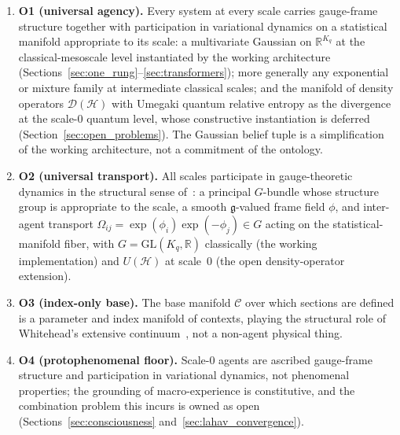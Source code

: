 \documentclass[11pt]{article}
\begin{document}
\begin{enumerate}
\item \textbf{O1 (universal agency).} Every system at every scale carries gauge-frame structure together with participation in variational dynamics on a statistical manifold appropriate to its scale: a multivariate Gaussian on $\mathbb{R}^{K_q}$ at the classical-mesoscale level instantiated by the working architecture (Sections~\ref{sec:one_rung}--\ref{sec:transformers}); more generally any exponential or mixture family at intermediate classical scales; and the manifold of density operators $\mathcal{D}(\mathcal{H})$ with Umegaki quantum relative entropy as the divergence at the scale-0 quantum level, whose constructive instantiation is deferred (Section~\ref{sec:open_problems}). The Gaussian belief tuple is a simplification of the working architecture, not a commitment of the ontology.
\item \textbf{O2 (universal transport).} All scales participate in gauge-theoretic dynamics in the structural sense of~\cite{Nakahara2003}: a principal $G$-bundle whose structure group is appropriate to the scale, a smooth $\mathfrak{g}$-valued frame field $\phi$, and inter-agent transport $\Omega_{ij} = \exp(\phi_i)\exp(-\phi_j) \in G$ acting on the statistical-manifold fiber, with $G = \mathrm{GL}(K_q,\mathbb{R})$ classically (the working implementation) and $U(\mathcal{H})$ at scale~0 (the open density-operator extension).
\item \textbf{O3 (index-only base).} The base manifold $\mathcal{C}$ over which sections are defined is a parameter and index manifold of contexts, playing the structural role of Whitehead's extensive continuum~\cite{Whitehead1929}, not a non-agent physical thing.
\item \textbf{O4 (protophenomenal floor).} Scale-0 agents are ascribed gauge-frame structure and participation in variational dynamics, not phenomenal properties; the grounding of macro-experience is constitutive, and the combination problem this incurs is owned as open (Sections~\ref{sec:consciousness} and~\ref{sec:lahav_convergence}).
\end{enumerate}
\end{document}
